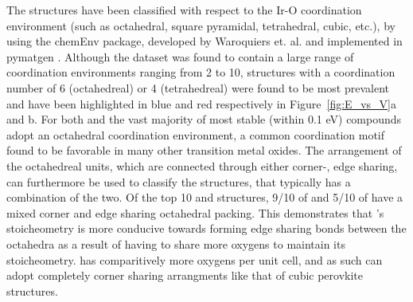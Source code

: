 %
The structures have been classified with respect to the Ir-O coordination environment (such as octahedral, square pyramidal, tetrahedral, cubic, etc.),
by using the chemEnv package, developed by Waroquiers et. al. \cite{Waroquiers2017} and implemented in pymatgen \cite{Ong2013}.
%
Although the dataset was found to contain a large range of coordination environments ranging from 2 to 10,
structures with a coordination number of 6 (octahedreal) or 4 (tetrahedreal) were found to be most prevalent
and have been highlighted in blue and red respectively in Figure~\ref{fig:E_vs_V}a and b.
%
For both \IrOtwo and \IrOthree the vast majority of most stable (within 0.1 eV) compounds adopt an octahedral coordination environment, a common coordination motif found to be favorable in many other transition metal oxides.\cite{Waroquiers2017}
%
The arrangement of the octahedreal units, which are connected through either corner-, edge sharing,
can furthermore be used to classify the structures, that typically has a combination of the two.
%
Of the top 10 \IrOtwo and \IrOthree structures, 9/10 of \IrOtwo and 5/10 of \IrOthree have a mixed corner and edge sharing octahedral packing.
%
This demonstrates that \IrOtwo's stoicheometry is more conducive towards forming edge sharing bonds between the octahedra as a result of having to share more oxygens to maintain its stoicheometry.
%
\IrOthree has comparitively more oxygens per unit cell, and as such can adopt completely corner sharing arrangments like that of cubic perovkite structures.

